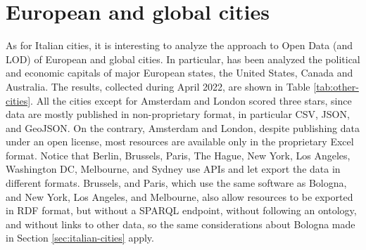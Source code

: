 \section{European and global cities}
\label{sec:other-cities}

As for Italian cities, it is interesting to analyze the approach to Open Data (and \acl{LOD}) of European and global cities. In particular, has been analyzed the political and economic capitals of major European states, the United States, Canada and Australia. The results, collected during April 2022, are shown in Table \ref{tab:other-cities}. All the cities except for Amsterdam and London scored three stars, since data are mostly published in non-proprietary format, in particular \ac{CSV}, \ac{JSON}, and Geo\ac{JSON}. On the contrary, Amsterdam and London, despite publishing data under an open license, most resources are available only in the proprietary Excel format. Notice that Berlin, Brussels, Paris, The Hague, New York, Los Angeles, Washington DC, Melbourne, and Sydney use \acsp{API} and let export the data in different formats.
Brussels, and Paris, which use the same software as Bologna, and New York, Los Angeles, and Melbourne, also allow resources to be exported in \ac{RDF} format, but without a \ac{SPARQL} endpoint, without following an ontology, and without links to other data, so the same considerations about Bologna made in Section \ref{sec:italian-cities} apply.

